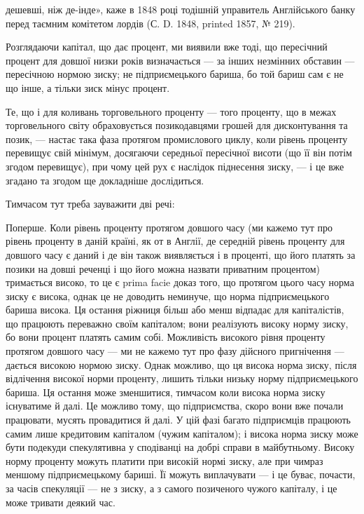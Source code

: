 \parcont{}  %
дешевші, ніж де-інде», каже в 1848 році тодішній управитель Англійського
банку перед таємним комітетом лордів (С. D. 1848, printed 1857, № 219).

Розглядаючи капітал, що дає процент, ми виявили вже тоді, що пересічний
процент для довшої низки років визначається — за інших незмінних обставин
— пересічною нормою зиску; не підприємецького бариша, бо той бариш
сам є не що інше, а тільки зиск мінус процент.

Те, що і для коливань торговельного проценту — того проценту, що в межах
торговельного світу обраховується позикодавцями грошей для дисконтування
та позик, — настає така фаза протягом промислового циклу, коли рівень проценту
перевищує свій мінімум, досягаючи середньої пересічної висоти (що її він
потім згодом перевищує), при чому цей рух є наслідок піднесення зиску, — і це
вже згадано та згодом ще докладніше дослідиться.

Тимчасом тут треба зауважити дві речі:

Поперше. Коли рівень проценту протягом довшого часу (ми кажемо тут
про рівень проценту в даній країні, як от в Англії, де середній рівень проценту
для довшого часу є даний і де він також виявляється і в проценті, що його платять
за позики на довші реченці і що його можна назвати приватним процентом)
тримається високо, то це є prima facie доказ того, що протягом цього
часу норма зиску є висока, однак це не доводить неминуче, що норма підприємецького
бариша висока. Ця остання ріжниця більш або менш відпадає для
капіталістів, що працюють переважно своїм капіталом; вони реалізують високу
норму зиску, бо вони процент платять самим собі. Можливість високого рівня
проценту протягом довшого часу — ми не кажемо тут про фазу дійсного пригнічення
— дається високою нормою зиску. Однак можливо, що ця висока норма
зиску, після відлічення високої норми проценту, лишить тільки низьку норму
підприємецького бариша. Ця остання може зменшитися, тимчасом коли висока
норма зиску існуватиме й далі. Це можливо тому, що підприємства, скоро вони
вже почали працювати, мусять провадитися й далі. У цій фазі багато підприємців
працюють самим лише кредитовим капіталом (чужим капіталом); і висока
норма зиску може бути подекуди спекулятивна у сподіванці на добрі справи
в майбутньому. Високу норму проценту можуть платити при високій нормі зиску,
але при чимраз меншому підприємецькому бариші. Її можуть виплачувати —
і це буває, почасти, за часів спекуляції — не з зиску, а з самого позиченого
чужого капіталу, і це може тривати деякий час.

